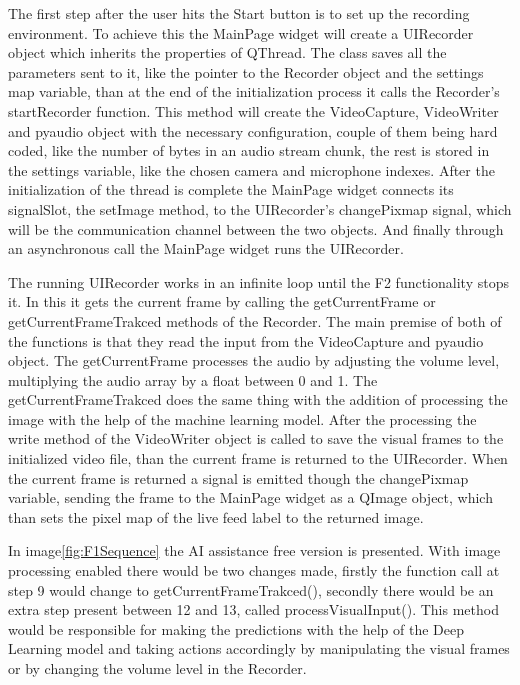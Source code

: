 \par The first step after the user hits the Start button is to set up the recording environment. To achieve this the MainPage widget will create a UIRecorder object which inherits the properties of QThread. The class saves all the parameters sent to it, like the pointer to the Recorder object and the settings map variable, than at the end of the initialization process it calls the Recorder's startRecorder function. This method will create the VideoCapture, VideoWriter and pyaudio object with the necessary configuration, couple of them being hard coded, like the number of bytes in an audio stream chunk, the rest is stored in the settings variable, like the chosen camera and microphone indexes. After the initialization of the thread is complete the MainPage widget connects its signalSlot, the setImage method, to the UIRecorder's changePixmap signal, which will be the communication channel between the two objects. And finally through an asynchronous call the MainPage widget runs the UIRecorder.
\par The running UIRecorder works in an infinite loop until the F2 functionality stops it. In this it gets the current frame by calling the getCurrentFrame or getCurrentFrameTrakced methods of the Recorder. The main premise of both of the functions is that they read the input from the VideoCapture and pyaudio object. The getCurrentFrame processes the audio by adjusting the volume level, multiplying the audio array by a float between 0 and 1. The getCurrentFrameTrakced does the same thing with the addition of processing the image with the help of the machine learning model. After the processing the write method of the VideoWriter object is called to save the visual frames to the initialized video file, than the current frame is returned to the UIRecorder. When the current frame is returned a signal is emitted though the changePixmap variable, sending the frame to the MainPage widget as a QImage object, which than sets the pixel map of the live feed label to the returned image.
\par In image\ref{fig:F1Sequence} the AI assistance free version is presented. With image processing enabled there would be two changes made, firstly the function call at step 9 would change to getCurrentFrameTrakced(), secondly there would be an extra step present between 12 and 13, called processVisualInput(). This method would be responsible for making the predictions with the help of the Deep Learning model and taking actions accordingly by manipulating the visual frames or by changing the volume level in the Recorder.